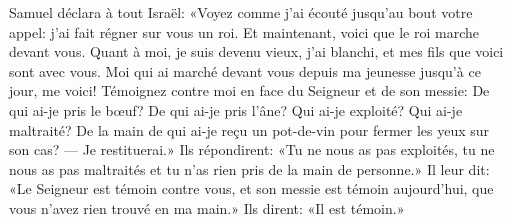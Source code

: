 Samuel déclara à tout Israël:
	«Voyez comme j’ai écouté jusqu’au bout votre appel: j’ai fait régner sur vous un roi.
Et maintenant, voici que le roi marche devant vous.
Quant à moi, je suis devenu vieux, j’ai blanchi,
	et mes fils que voici sont avec vous.
Moi qui ai marché devant vous depuis ma jeunesse jusqu’à ce jour,
	me voici! Témoignez contre moi en face du Seigneur et de son messie:
	De qui ai-je pris le bœuf? De qui ai-je pris l’âne?
	Qui ai-je exploité? Qui ai-je maltraité?
	De la main de qui ai-je reçu un pot-de-vin pour fermer les yeux sur son cas?
	--- Je restituerai.»
Ils répondirent: «Tu ne nous as pas exploités,
	tu ne nous as pas maltraités et tu n’as rien pris de la main de personne.»
Il leur dit: «Le Seigneur est témoin contre vous, et son messie est témoin aujourd’hui,
	que vous n’avez rien trouvé en ma main.»
Ils dirent: «Il est témoin.»
